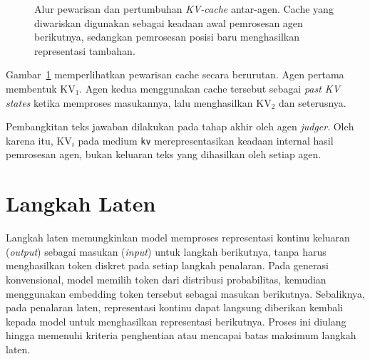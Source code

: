 \begin{figure}[H]

    \caption{Alur pewarisan dan pertumbuhan \textit{KV-cache}
    antar-agen. Cache yang diwariskan digunakan sebagai keadaan
    awal pemrosesan agen berikutnya, sedangkan pemrosesan posisi
    baru menghasilkan representasi tambahan.}
    \label{fig:kv-agent-transfer}
\end{figure}

Gambar~\ref{fig:kv-agent-transfer} memperlihatkan pewarisan cache
secara berurutan. Agen pertama membentuk $\mathrm{KV}_1$.
Agen kedua menggunakan cache tersebut sebagai
\textit{past KV states} ketika memproses masukannya, lalu
menghasilkan $\mathrm{KV}_2$ dan seterusnya.

Pembangkitan teks jawaban dilakukan pada tahap akhir
oleh agen \textit{judger}. Oleh karena itu, $\mathrm{KV}_i$
pada medium \texttt{kv} merepresentasikan keadaan internal hasil
pemrosesan agen, bukan keluaran teks yang dihasilkan oleh setiap
agen.

\section{Langkah Laten}
\label{sec:langkah-laten}

Langkah laten memungkinkan model memproses representasi kontinu keluaran (\textit{output}) sebagai
masukan (\textit{input}) untuk langkah berikutnya, tanpa harus menghasilkan token diskret
pada setiap langkah penalaran. Pada generasi konvensional, model memilih
token dari distribusi probabilitas, kemudian menggunakan embedding token
tersebut sebagai masukan berikutnya. Sebaliknya, pada penalaran laten,
representasi kontinu dapat langsung diberikan kembali kepada model untuk
menghasilkan representasi berikutnya. Proses ini diulang hingga memenuhi
kriteria penghentian atau mencapai batas maksimum langkah laten.

